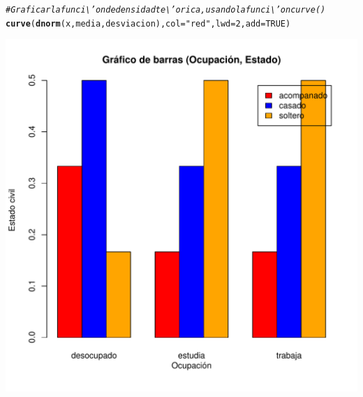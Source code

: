 \documentclass[12pt,letterpaper]{article}\usepackage[]{graphicx}\usepackage[]{color}
\makeatletter
\def\maxwidth{ %
  \ifdim\Gin@nat@width>\linewidth
    \linewidth
  \else
    \Gin@nat@width
  \fi
}
\newcommand{\hlnum}[1]{\textcolor[rgb]{0.686,0.059,0.569}{#1}}%
\newcommand{\hlstr}[1]{\textcolor[rgb]{0.192,0.494,0.8}{#1}}%
\newcommand{\hlcom}[1]{\textcolor[rgb]{0.678,0.584,0.686}{\textit{#1}}}%
\newcommand{\hlstd}[1]{\textcolor[rgb]{0.345,0.345,0.345}{#1}}%
\newcommand{\hlkwc}[1]{\textcolor[rgb]{0.333,0.667,0.333}{#1}}%
\newcommand{\hlkwd}[1]{\textcolor[rgb]{0.737,0.353,0.396}{\textbf{#1}}}%
\newenvironment{kframe}{%
 \def\at@end@of@kframe{}%
 \ifinner\ifhmode%
  \def\at@end@of@kframe{\end{minipage}}%
  \begin{minipage}{\columnwidth}%
 \fi\fi%
 \def\FrameCommand##1{\hskip\@totalleftmargin \hskip-\fboxsep
 \colorbox{shadecolor}{##1}\hskip-\fboxsep
     \hskip-\linewidth \hskip-\@totalleftmargin \hskip\columnwidth}%
 \MakeFramed {\advance\hsize-\width
   \@totalleftmargin\z@ \linewidth\hsize
   \@setminipage}}%
 {\par\unskip\endMakeFramed%
 \at@end@of@kframe}
\newenvironment{knitrout}{}{} %
\makeatother
\begin{document}
\begin{knitrout}
\begin{kframe}
\begin{alltt}
\hlcom{# Graficar la funci\textbackslash{}'on de densidad te\textbackslash{}'orica, usando la funci\textbackslash{}'on curve() }
\hlkwd{curve}\hlstd{(}\hlkwd{dnorm}\hlstd{(x, media, desviacion),} \hlkwc{col}\hlstd{=}\hlstr{"red"}\hlstd{,} \hlkwc{lwd}\hlstd{=}\hlnum{2}\hlstd{,} \hlkwc{add}\hlstd{=}\hlnum{TRUE}\hlstd{)}
\end{alltt}
\end{kframe}
\includegraphics[width=\maxwidth]{figure/unnamed-chunk-17-1} 

\end{knitrout}
\end{document}
